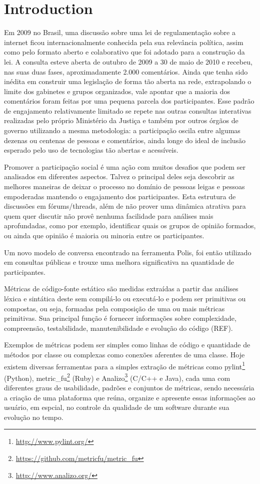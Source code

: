 \documentclass{llncs}
\begin{document}
\section{Introduction}
\label{sec:intro}
  Em 2009 no Brasil, uma discussão sobre uma lei de regulamentação sobre a internet
  ficou internacionalmente conhecida pela sua relevância política, assim como
  pelo formato aberto e colaborativo que foi adotado para a construção da lei.
  A consulta esteve aberta de outubro de 2009 a 30 de maio de 2010 e recebeu,
  nas suas duas fases, aproximadamente 2.000 comentários.
  Ainda que tenha sido inédita em construir uma legislação de forma tão aberta
  na rede, extrapolando o limite dos gabinetes e grupos organizados, vale apontar
  que a maioria dos comentários foram feitas por uma pequena parcela dos participantes.
  Esse padrão de engajamento relativamente limitado se repete nas outras consultas
  interativas realizadas pelo próprio Ministério da Justiça e também por outros
  órgãos de governo utilizando a mesma metodologia: a participação oscila entre
  algumas dezenas ou centenas de pessoas e comentários, ainda longe do ideal de
  inclusão esperado pelo uso de tecnologias tão abertas e acessíveis.

  Promover a participação social é uma ação com muitos desafios que podem
  ser analisados em diferentes aspectos. Talvez o principal deles seja descobrir
  as melhores maneiras de deixar o processo no domínio  de pessoas leigas e 
  pessoas empoderadas mantendo o engajamento dos participantes. Esta estrutura
  de discussões em fórums/threads, além de não prover uma dinâmica atrativa para
  quem quer discutir não provê nenhuma facilidade para análises mais aprofundadas,
  como por exemplo, identificar quais os grupos de opinião formados, ou ainda
  que opinião é maioria ou minoria entre os participantes.

  Um novo modelo de conversa encontrado na ferramenta Polis, foi então
  utilizado em consultas públicas e trouxe uma melhora significativa na quantidade
  de participantes.


Métricas de código-fonte estático são medidas extraídas a partir das análises
léxica e sintática deste sem compilá-lo ou executá-lo e podem ser primitivas ou
compostas, ou seja, formadas pela composição de uma ou mais métricas
primitivas. Sua principal função é fornecer informações sobre complexidade,
compreensão, testabilidade, manutenibilidade e evolução do
código (REF).

Exemplos de métricas podem ser simples como linhas de código e quantidade de
métodos por classe ou complexas como conexões aferentes de uma classe.  Hoje
existem diversas ferramentas para a simples extração de métricas como
pylint\footnote{\url{http://www.pylint.org/}} (Python),
metric\_fu\footnote{\url{https://github.com/metricfu/metric_fu}} (Ruby) e
Analizo\footnote{\url{http://www.analizo.org/}} (C/C++ e Java), cada uma com
diferentes graus de usabilidade, padrões e conjuntos de métricas, sendo
necessária a criação de uma plataforma que reúna, organize e apresente essas
informações ao usuário, em espcial, no controle da qualidade de um
software durante sua evolução no tempo.
\end{document}
